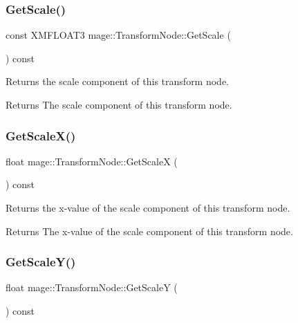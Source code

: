 \subsubsection{\texorpdfstring{Get\+Scale()}{GetScale()}}
{\footnotesize\ttfamily const X\+M\+F\+L\+O\+A\+T3 mage\+::\+Transform\+Node\+::\+Get\+Scale (\begin{DoxyParamCaption}{ }\end{DoxyParamCaption}) const}

Returns the scale component of this transform node.

\begin{DoxyReturn}{Returns}
The scale component of this transform node. 
\end{DoxyReturn}
\hypertarget{classmage_1_1_transform_node_a465204839a047c6cddbb551a549da741}{}\label{classmage_1_1_transform_node_a465204839a047c6cddbb551a549da741} 
\subsubsection{\texorpdfstring{Get\+Scale\+X()}{GetScaleX()}}
{\footnotesize\ttfamily float mage\+::\+Transform\+Node\+::\+Get\+ScaleX (\begin{DoxyParamCaption}{ }\end{DoxyParamCaption}) const}

Returns the x-\/value of the scale component of this transform node.

\begin{DoxyReturn}{Returns}
The x-\/value of the scale component of this transform node. 
\end{DoxyReturn}
\hypertarget{classmage_1_1_transform_node_a8b4023dc2dd9a62012ee0aa36ec022b5}{}\label{classmage_1_1_transform_node_a8b4023dc2dd9a62012ee0aa36ec022b5} 
\subsubsection{\texorpdfstring{Get\+Scale\+Y()}{GetScaleY()}}
{\footnotesize\ttfamily float mage\+::\+Transform\+Node\+::\+Get\+ScaleY (\begin{DoxyParamCaption}{ }\end{DoxyParamCaption}) const}


